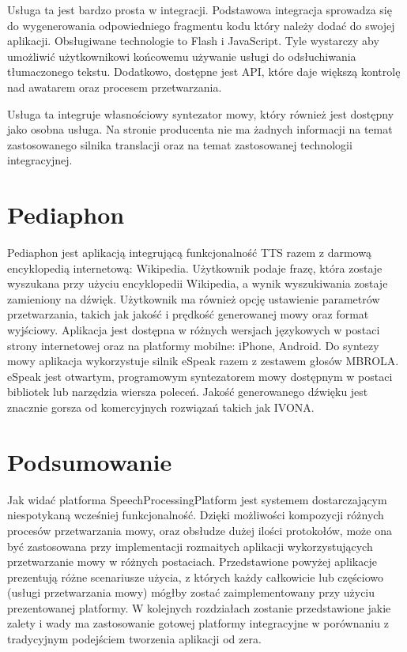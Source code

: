 Usługa ta jest bardzo prosta w integracji. Podstawowa integracja sprowadza się do wygenerowania odpowiedniego fragmentu kodu który należy dodać do swojej aplikacji. Obsługiwane technologie to Flash i JavaScript. Tyle wystarczy aby umożliwić użytkownikowi końcowemu używanie usługi do odsłuchiwania tłumaczonego tekstu. Dodatkowo, dostępne jest API, które daje większą kontrolę nad awatarem oraz procesem przetwarzania. 

Usługa ta integruje własnościowy syntezator mowy, który również jest dostępny jako osobna usługa. Na stronie producenta nie ma żadnych informacji na temat zastosowanego silnika translacji oraz na temat zastosowanej technologii integracyjnej.

\section {Pediaphon} 

Pediaphon\cite{pediaphon} jest aplikacją integrującą funkcjonalność TTS razem z darmową encyklopedią internetową: Wikipedia. Użytkownik podaje frazę, która zostaje wyszukana przy użyciu encyklopedii Wikipedia, a wynik wyszukiwania zostaje zamieniony na dźwięk. Użytkownik ma również opcję ustawienie parametrów przetwarzania, takich jak jakość i prędkość generowanej mowy oraz format wyjściowy. Aplikacja jest dostępna w różnych wersjach językowych w postaci strony internetowej oraz na platformy mobilne: iPhone, Android. Do syntezy mowy aplikacja wykorzystuje silnik eSpeak razem z zestawem głosów MBROLA. eSpeak jest otwartym, programowym syntezatorem mowy dostępnym w postaci bibliotek lub narzędzia wiersza poleceń. Jakość generowanego dźwięku jest znacznie gorsza od komercyjnych rozwiązań takich jak IVONA.

\section*{Podsumowanie} 
Jak widać platforma SpeechProcessingPlatform jest systemem dostarczającym niespotykaną wcześniej funkcjonalność. Dzięki możliwości kompozycji różnych procesów przetwarzania mowy, oraz obsłudze dużej ilości protokołów, może ona być zastosowana przy implementacji rozmaitych aplikacji wykorzystujących przetwarzanie mowy w różnych postaciach. Przedstawione powyżej aplikacje prezentują różne scenariusze użycia, z których każdy całkowicie lub częściowo (usługi przetwarzania mowy) mógłby zostać zaimplementowany przy użyciu prezentowanej platformy. W kolejnych rozdziałach zostanie przedstawione jakie zalety i wady ma zastosowanie gotowej platformy integracyjne w porównaniu z tradycyjnym podejściem tworzenia aplikacji od zera.





